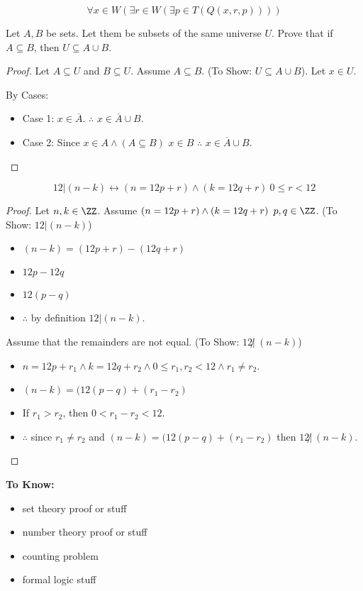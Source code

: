 \begin{example}[5a]
\[ \forall x\in W \left( \exists r \in W \left( \exists p \in T \left( Q(x,r,p) \right) \right) \right) \]
\end{example}

\begin{example}[7]
Let $A,B$ be sets. Let them be subsets of the same universe $U$. Prove that if $A\subseteq B$, then $U \subseteq A \cup B$.
\end{example}

\begin{proof}
Let $A \subseteq U$ and $B \subseteq U$. Assume $A \subseteq B$. (To Show: $U \subseteq A \cup B$). Let $x\in U$.

By Cases:
\begin{itemize}
\item Case 1: $x\in \overline{A}$. $\therefore$ $x\in \overline{A}\cup B$.
\item Case 2: Since $x \in A \wedge \left( A \subseteq B \right)$ $x \in B$ $\therefore$ $x \in \overline{A} \cup B$.
\end{itemize}
\end{proof}

\begin{example}[6c]
\[ 12 | (n-k) \leftrightarrow \left( n = 12p + r \right) \wedge \left( k = 12q + r \right)\ 0\le r < 12 \]
\end{example}

\begin{proof}
Let $n,k\in\ZZ$. Assume $\left( n = 12p + r \right) \wedge \left( k = 12q + r \right)\ p,q\in\ZZ$. (To Show: $12|(n-k)$)
\begin{itemize}
\item $(n-k) = \left( 12p + r \right) - \left( 12q + r \right)$
\item $12p-12q$
\item $12(p-q)$
\item $\therefore$ by definition $12|(n-k)$.
\end{itemize}
Assume that the remainders are not equal. (To Show: $12 \not |\ (n-k) $)
\begin{itemize}
\item $n=12p+r_1 \wedge k=12q+r_2 \wedge 0 \le r_1,r_2 < 12 \wedge r_1 \neq r_2$.
\item $(n-k)=(12(p-q)+(r_1-r_2)$
\item If $r_1 > r_2$, then $0 < r_1-r_2 < 12$.
\item $\therefore$ since $r_1 \neq r_2$ and $(n-k)=(12(p-q)+(r_1-r_2)$ then $12 \not |\ (n-k) $.
\end{itemize}
\end{proof}

\textbf{To Know:}
\begin{itemize}
\item set theory proof or stuff
\item number theory proof or stuff
\item counting problem
\item formal logic stuff
\end{itemize}



